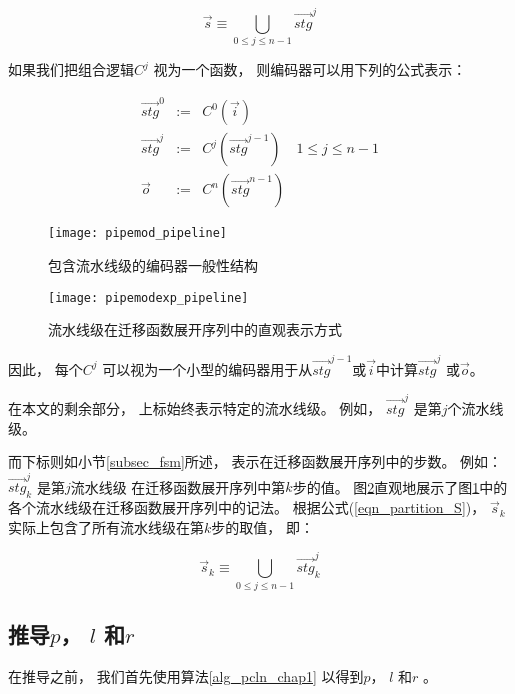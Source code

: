 \begin{equation}\label{eqn_partition_S}
\vec{s}\equiv \bigcup _{0\le j\le n-1} \vec{stg}^j
\end{equation}

如果我们把组合逻辑$C^j$ 视为一个函数，
则编码器可以用下列的公式表示：

\begin{equation}\label{equ_genpipe}
\begin{array}{cccc}
\vec{stg}^0   & := & C^0(\vec{i})         &\\
\vec{stg}^j   & := & C^j(\vec{stg}^{j-1}) & 1\le j\le n-1\\
\vec{o}       & := & C^n(\vec{stg}^{n-1}) &
\end{array}
\end{equation}


\begin{figure}[t]
\begin{center}
\texttt{[image: pipemod\_pipeline]}
\end{center}
\caption{包含流水线级的编码器一般性结构}
  \label{fig_pipeenc_chap4}
\end{figure}

\begin{figure}[t]
\begin{center}
\texttt{[image: pipemodexp\_pipeline]}
\end{center}
\caption{流水线级在迁移函数展开序列中的直观表示方式}
  \label{fig_pipeencexp_chap4}
\end{figure}


因此，
每个$C^j$ 可以视为一个小型的编码器用于从$\vec{stg}^{j-1}$或$\vec{i}$中计算$\vec{stg}^j$ 或$\vec{o}$。


在本文的剩余部分，
上标始终表示特定的流水线级。
例如，
$\vec{stg}^j$ 是第$j$个流水线级。

而下标则如小节\ref{subsec_fsm}所述，
表示在迁移函数展开序列中的步数。
例如：$\vec{stg}^j_k$ 是第$j$流水线级
在迁移函数展开序列中第$k$步的值。
图\ref{fig_pipeencexp_chap4}直观地展示了图\ref{fig_pipeenc_chap4}中的各个流水线级在迁移函数展开序列中的记法。
根据公式(\ref{eqn_partition_S})，
$\vec{s}_k$实际上包含了所有流水线级在第$k$步的取值，
即：

\begin{equation}\label{eqn_partition_Sk}
\vec{s}_k\equiv \bigcup _{0\le j\le n-1} \vec{stg}^j_k
\end{equation}

\subsection{推导$p$， $l$ 和$r$}\label{subsec_inferplr}
在推导之前，
我们首先使用算法\ref{alg_pcln_chap1} 以得到$p$， $l$ 和$r$ 。


